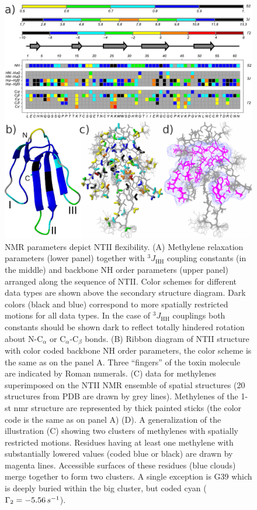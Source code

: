 \documentclass[twocolumn]{svjour3}           %
\begin{document}
\begin{figure}
    \centering
    \includegraphics[width=\textwidth]{Fig6}
    \caption{NMR parameters depict NTII flexibility.
    (A) Methylene relaxation parameters \gtwo{} (lower panel) together with
    $^3J_\text{HH}$
    coupling constants (in the middle) and backbone NH order parameters 
    (upper panel) arranged along the sequence of NTII. 
    Color schemes for different data types are shown above the secondary 
    structure diagram. Dark colors (black and blue) correspond to more 
    spatially restricted motions for all data types. 
    In the case of $^3J_\text{HH}$ couplings both constants should be shown dark 
    to reflect totally hindered rotation about N-$\text{C}_\alpha$ or 
    $\text{C}_\alpha$-$\text{C}_\beta$ bonds.
    (B) Ribbon diagram of NTII structure with color coded backbone NH order parameters, the color scheme is the same as on the panel A. 
    Three \enquote{fingers} of the toxin molecule are indicated by Roman numerals.
    (C) \gtwo{} data for methylenes superimposed on the NTII NMR ensemble of 
    spatial structures (20 structures from PDB are drawn by grey lines). 
    Methylenes of the 1-st nmr structure are represented by thick painted 
    sticks  (the color code is the same as on panel A) 
    (D). A generalization of the illustration (C) showing two clusters 
    of methylenes with spatially restricted motions. Residues having 
    at least one methylene with substantially lowered  \gtwo{} values 
    (coded blue or black) are drawn by magenta lines. Accessible surfaces 
    of these residues (blue clouds) merge together to form two clusters. 
    A single exception is G39 which is deeply buried within the big cluster, 
    but coded cyan ($\Gamma_2=-5.56\,s^{-1}$). 
    }
    \label{fig:g2:struct}
\end{figure}
\end{document}
